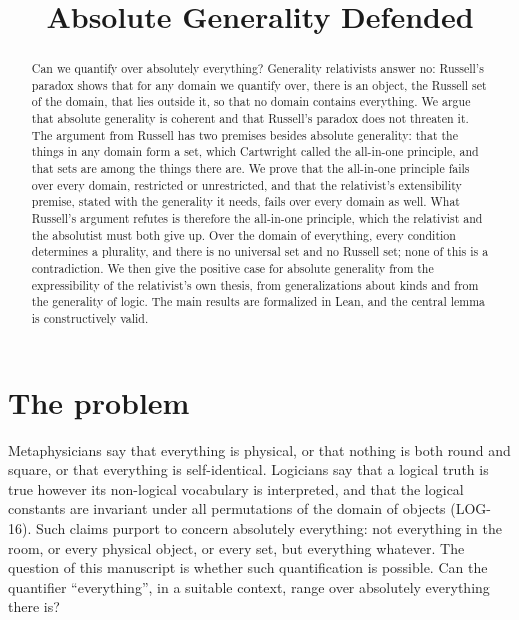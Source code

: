 \documentclass{situationist-preprint}
\title{Absolute Generality Defended}
\begin{document}
\maketitle

\begin{abstract}
Can we quantify over absolutely everything? Generality relativists answer no: Russell's paradox shows that for any domain we quantify over, there is an object, the Russell set of the domain, that lies outside it, so that no domain contains everything. We argue that absolute generality is coherent and that Russell's paradox does not threaten it. The argument from Russell has two premises besides absolute generality: that the things in any domain form a set, which Cartwright called the all-in-one principle, and that sets are among the things there are. We prove that the all-in-one principle fails over every domain, restricted or unrestricted, and that the relativist's extensibility premise, stated with the generality it needs, fails over every domain as well. What Russell's argument refutes is therefore the all-in-one principle, which the relativist and the absolutist must both give up. Over the domain of everything, every condition determines a plurality, and there is no universal set and no Russell set; none of this is a contradiction. We then give the positive case for absolute generality from the expressibility of the relativist's own thesis, from generalizations about kinds and from the generality of logic. The main results are formalized in Lean, and the central lemma is constructively valid.
\end{abstract}

\section{The problem}

Metaphysicians say that everything is physical, or that nothing is both round and square, or that everything is self-identical. Logicians say that a logical truth is true however its non-logical vocabulary is interpreted, and that the logical constants are invariant under all permutations of the domain of objects (LOG-16). Such claims purport to concern absolutely everything: not everything in the room, or every physical object, or every set, but everything whatever. The question of this manuscript is whether such quantification is possible. Can the quantifier \enquote{everything}, in a suitable context, range over absolutely everything there is?
\end{document}
